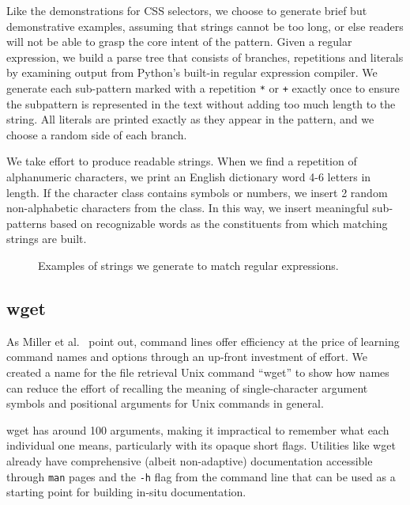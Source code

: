 Like the demonstrations for CSS selectors, we choose to generate brief but demonstrative examples, assuming that strings cannot be too long, or else readers will not be able to grasp the core intent of the pattern.
Given a regular expression, we build a parse tree that consists of branches, repetitions and literals by examining output from Python's built-in regular expression compiler.
We generate each sub-pattern marked with a repetition \texttt{*} or \texttt{+} exactly once to ensure the subpattern is represented in the text without adding too much length to the string.
All literals are printed exactly as they appear in the pattern, and we choose a random side of each branch. 

We take effort to produce readable strings.
When we find a repetition of alphanumeric characters, we print an English dictionary word 4-6 letters in length.
If the character class contains symbols or numbers, we insert 2 random non-alphabetic characters from the class.
In this way, we insert meaningful sub-patterns based on recognizable words as the constituents from which matching strings are built.
\fi

\begin{figure}
\centering
\setlength{\fboxsep}{10pt}
\noindent{}
\caption{Examples of strings we generate to match regular expressions.}
\label{fig:regex_strings}
\end{figure}

\subsection{wget}

\begin{changes}
As Miller et al.~\cite{miller_inky_2008} point out, command lines offer efficiency at the price of learning command names and options through an up-front investment of effort.
We created a \Gls{name} for the file retrieval Unix command ``wget'' to show how \Glspl{name} can reduce the effort of recalling the meaning of single-character argument symbols and positional arguments for Unix commands in general.
\end{changes}
wget has around 100 arguments, making it impractical to remember what each individual one means, particularly with its opaque short flags.
Utilities like wget already have comprehensive (albeit non-adaptive) documentation accessible through \texttt{man} pages and the \texttt{-h} flag from the command line that can be used as a starting point for building in-situ documentation.

